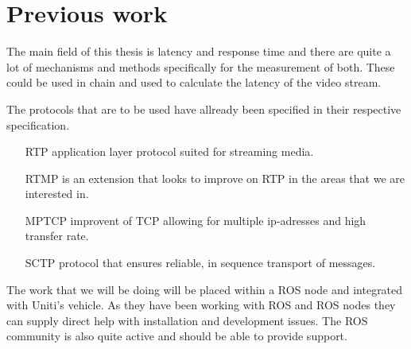 \documentclass[a4paper]{article}
\begin{document}


\section{Previous work}


The main field of this thesis is latency and response time and there are quite a
lot of mechanisms and methods specifically for the measurement of both. These
could be used in chain and used to calculate the latency of the video stream.

The protocols that are to be used have allready been specified in their
respective specification.

\begin{itemize}
	\item[RTP] application layer protocol suited for streaming media.
	\item[RTMP] is an extension that looks to improve on RTP in the areas that we
		are interested in.
	\item[MPTCP] improvent of TCP allowing for multiple ip-adresses and high
		transfer rate.
	\item[SCTP] protocol that ensures reliable, in sequence transport of messages.
\end{itemize}

The work that we will be doing will be placed within a ROS node and integrated
with Uniti's vehicle. As they have been working with ROS and ROS nodes they can
supply direct help with installation and development issues. The ROS community
is also quite active and should be able to provide support.
\end{document}
